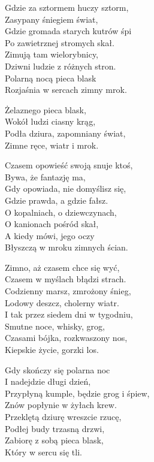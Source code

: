 \begin{text}
    Gdzie za sztormem huczy sztorm,\\
    Zasypany śniegiem świat,\\
    Gdzie gromada starych kutrów śpi\\
    Po zawietrznej stromych skał.\\
    Zimują tam wielorybnicy,\\
    Dziwni ludzie z różnych stron.\\
    Polarną nocą pieca blask\\
    Rozjaśnia w sercach zimny mrok.

    \vin Żelaznego pieca blask,\\
    \vin Wokół ludzi ciasny krąg,\\
    \vin Podła dziura, zapomniany świat,\\
    \vin Zimne ręce, wiatr i mrok.

    Czasem opowieść swoją snuje ktoś,\\
    Bywa, że fantazję ma,\\
    Gdy opowiada, nie domyślisz się,\\
    Gdzie prawda, a gdzie fałsz.\\
    O kopalniach, o dziewczynach,\\
    O kanionach pośród skał,\\
    A kiedy mówi, jego oczy\\
    Błyszczą w mroku zimnych ścian.

    Zimno, aż czasem chce się wyć,\\
    Czasem w myślach błądzi strach.\\
    Codzienny marsz, zmrożony śnieg,\\
    Lodowy deszcz, cholerny wiatr.\\
    I tak przez siedem dni w tygodniu,\\
    Smutne noce, whisky, grog,\\
    Czasami bójka, rozkwaszony nos,\\
    Kiepskie życie, gorzki los.

    Gdy skończy się polarna noc\\
    I nadejdzie długi dzień,\\
    Przypłyną kumple, będzie grog i śpiew,\\
    Znów popłynie w żyłach krew.\\
    Przeklętą dziurę wreszcie rzucę,\\
    Podłej budy trzasną drzwi,\\
    Zabiorę z sobą pieca blask,\\
    Który w sercu się tli.
\end{text}
\begin{chord}

\end{chord}